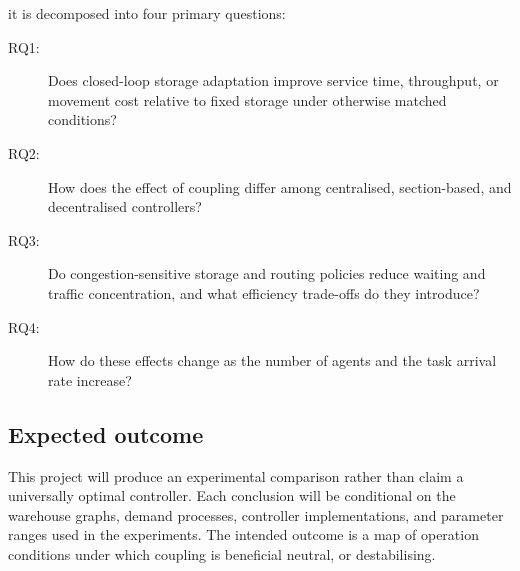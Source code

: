 it is decomposed into four primary questions: 
\begin{description}
  \item[RQ1:] Does closed-loop storage adaptation improve service time,
  throughput, or movement cost relative to fixed storage under otherwise
  matched conditions?
  \item[RQ2:] How does the effect of coupling differ among centralised,
  section-based, and decentralised controllers?
  \item[RQ3:] Do congestion-sensitive storage and routing policies reduce
  waiting and traffic concentration, and what efficiency trade-offs do they
  introduce?
  \item[RQ4:] How do these effects change as the number of agents and the task
  arrival rate increase?
\end{description}


\subsection{Expected outcome}
This project will produce an experimental comparison rather than claim a universally optimal controller. Each conclusion will be conditional on the warehouse graphs, demand processes, controller implementations, and parameter ranges used in the experiments. The intended outcome is a map of operation conditions under which coupling is beneficial neutral, or destabilising.
